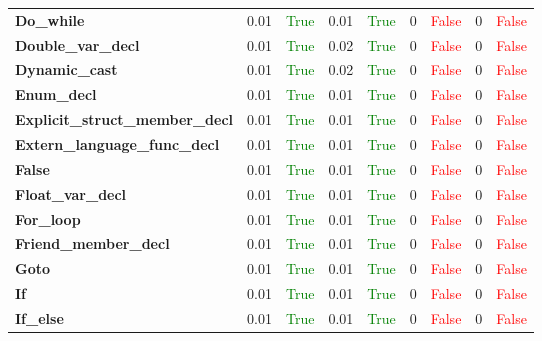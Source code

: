 \documentclass{article}
\begin{document}
\begin{xltabular}{\textwidth}{lcccccccc}
\textbf{{\fontsize{10}{12}\selectfont Do\_while}}& 0.01&\textcolor{green}{True}& 0.01&\textcolor{green}{True}& 0&\textcolor{red}{False}& 0&\textcolor{red}{False} \\[0.5ex]
\textbf{{\fontsize{10}{12}\selectfont Double\_var\_decl}}& 0.01&\textcolor{green}{True}& 0.02&\textcolor{green}{True}& 0&\textcolor{red}{False}& 0&\textcolor{red}{False} \\[0.5ex]
\textbf{{\fontsize{10}{12}\selectfont Dynamic\_cast}}& 0.01&\textcolor{green}{True}& 0.02&\textcolor{green}{True}& 0&\textcolor{red}{False}& 0&\textcolor{red}{False} \\[0.5ex]
\textbf{{\fontsize{10}{12}\selectfont Enum\_decl}}& 0.01&\textcolor{green}{True}& 0.01&\textcolor{green}{True}& 0&\textcolor{red}{False}& 0&\textcolor{red}{False} \\[0.5ex]
\textbf{{\fontsize{10}{12}\selectfont Explicit\_struct\_member\_decl}}& 0.01&\textcolor{green}{True}& 0.01&\textcolor{green}{True}& 0&\textcolor{red}{False}& 0&\textcolor{red}{False} \\[0.5ex]
\textbf{{\fontsize{10}{12}\selectfont Extern\_language\_func\_decl}}& 0.01&\textcolor{green}{True}& 0.01&\textcolor{green}{True}& 0&\textcolor{red}{False}& 0&\textcolor{red}{False} \\[0.5ex]
\textbf{{\fontsize{10}{12}\selectfont False}}& 0.01&\textcolor{green}{True}& 0.01&\textcolor{green}{True}& 0&\textcolor{red}{False}& 0&\textcolor{red}{False} \\[0.5ex]
\textbf{{\fontsize{10}{12}\selectfont Float\_var\_decl}}& 0.01&\textcolor{green}{True}& 0.01&\textcolor{green}{True}& 0&\textcolor{red}{False}& 0&\textcolor{red}{False} \\[0.5ex]
\textbf{{\fontsize{10}{12}\selectfont For\_loop}}& 0.01&\textcolor{green}{True}& 0.01&\textcolor{green}{True}& 0&\textcolor{red}{False}& 0&\textcolor{red}{False} \\[0.5ex]
\textbf{{\fontsize{10}{12}\selectfont Friend\_member\_decl}}& 0.01&\textcolor{green}{True}& 0.01&\textcolor{green}{True}& 0&\textcolor{red}{False}& 0&\textcolor{red}{False} \\[0.5ex]
\textbf{{\fontsize{10}{12}\selectfont Goto}}& 0.01&\textcolor{green}{True}& 0.01&\textcolor{green}{True}& 0&\textcolor{red}{False}& 0&\textcolor{red}{False} \\[0.5ex]
\textbf{{\fontsize{10}{12}\selectfont If}}& 0.01&\textcolor{green}{True}& 0.01&\textcolor{green}{True}& 0&\textcolor{red}{False}& 0&\textcolor{red}{False} \\[0.5ex]
\textbf{{\fontsize{10}{12}\selectfont If\_else}}& 0.01&\textcolor{green}{True}& 0.01&\textcolor{green}{True}& 0&\textcolor{red}{False}& 0&\textcolor{red}{False} \\[0.5ex]

\end{xltabular}
\end{document}
